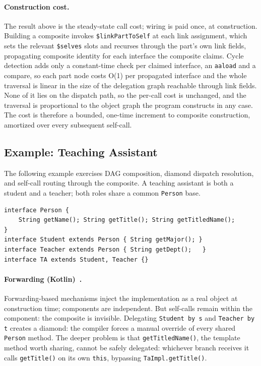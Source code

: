 \documentclass[acmsmall,nonacm]{acmart}
\theoremstyle{acmplain}
\theoremstyle{acmdefinition}
\newcommand{\code}[1]{\texttt{#1}}
\begin{document}
\paragraph{Construction cost.}
The result above is the steady-state call cost; wiring is paid once, at
construction. Building a composite invokes \code{\$linkPartToSelf} at each link
assignment, which sets the relevant \code{\$selves} slots and recurses through the
part's own link fields, propagating composite identity for each interface the
composite claims. Cycle detection adds only a constant-time check per claimed
interface, an \code{aaload} and a compare, so each part node costs O(1) per
propagated interface and the whole traversal is linear in the size of the
delegation graph reachable through link fields. None of it lies on the dispatch
path, so the per-call cost is unchanged, and the traversal is proportional to the
object graph the program constructs in any case. The cost is therefore a bounded,
one-time increment to composite construction, amortized over every subsequent
self-call.

\subsection{Example: Teaching Assistant}

The following example exercises DAG composition, diamond dispatch resolution,
and self-call routing through the composite. A teaching assistant is both
a student and a teacher; both roles share a common \code{Person} base.

\begin{lstlisting}
interface Person {
    String getName(); String getTitle(); String getTitledName();
}
interface Student extends Person { String getMajor(); }
interface Teacher extends Person { String getDept();   }
interface TA extends Student, Teacher {}
\end{lstlisting}

\paragraph{Forwarding (Kotlin)~\cite{kotlin,lombok}.}
Forwarding-based mechanisms inject the implementation as a real object at
construction time; components are independent. But self-calls remain within
the component: the composite is invisible. Delegating
\code{Student by s} and \code{Teacher by t} creates a diamond: the compiler
forces a manual override of every shared \code{Person} method. The deeper problem is that
\code{getTitledName()}, the template method worth sharing, cannot be safely
delegated: whichever branch receives it calls \code{getTitle()} on its own
\code{this}, bypassing \code{TaImpl.getTitle()}.
\end{document}
